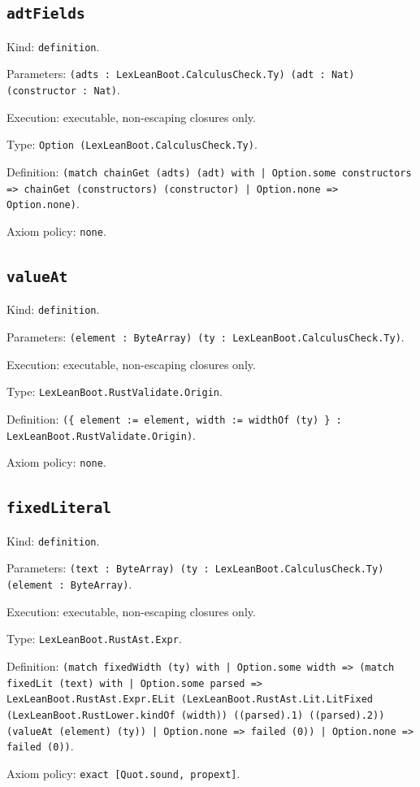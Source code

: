 \documentclass[11pt]{article}
\begin{document}
\subsection*{\texttt{adtFields}}
\noindent Kind: \texttt{definition}.\par
\noindent Parameters: \texttt{(adts : LexLeanBoot.CalculusCheck.Ty) (adt : Nat) (constructor : Nat)}.\par
\noindent Execution: executable, non-escaping closures only.\par
\noindent Type: \texttt{Option (LexLeanBoot.CalculusCheck.Ty)}.\par
\noindent Definition: \texttt{(match chainGet (adts) (adt) with | Option.some constructors => chainGet (constructors) (constructor) | Option.none => Option.none)}.\par
\noindent Axiom policy: \texttt{none}.\par
\subsection*{\texttt{valueAt}}
\noindent Kind: \texttt{definition}.\par
\noindent Parameters: \texttt{(element : ByteArray) (ty : LexLeanBoot.CalculusCheck.Ty)}.\par
\noindent Execution: executable, non-escaping closures only.\par
\noindent Type: \texttt{LexLeanBoot.RustValidate.Origin}.\par
\noindent Definition: \texttt{(\{ element := element, width := widthOf (ty) \} : LexLeanBoot.RustValidate.Origin)}.\par
\noindent Axiom policy: \texttt{none}.\par
\subsection*{\texttt{fixedLiteral}}
\noindent Kind: \texttt{definition}.\par
\noindent Parameters: \texttt{(text : ByteArray) (ty : LexLeanBoot.CalculusCheck.Ty) (element : ByteArray)}.\par
\noindent Execution: executable, non-escaping closures only.\par
\noindent Type: \texttt{LexLeanBoot.RustAst.Expr}.\par
\noindent Definition: \texttt{(match fixedWidth (ty) with | Option.some width => (match fixedLit (text) with | Option.some parsed => LexLeanBoot.RustAst.Expr.ELit (LexLeanBoot.RustAst.Lit.LitFixed (LexLeanBoot.RustLower.kindOf (width)) ((parsed).1) ((parsed).2)) (valueAt (element) (ty)) | Option.none => failed (0)) | Option.none => failed (0))}.\par
\noindent Axiom policy: \texttt{exact [Quot.sound, propext]}.\par
\end{document}
